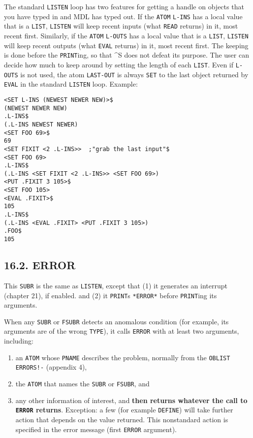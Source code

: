 \documentclass[a4paper,]{article}
\providecommand{\tightlist}{%
  \setlength{\itemsep}{0pt}\setlength{\parskip}{0pt}}
\begin{document}
The standard \texttt{LISTEN} loop has two features for getting a handle on objects that you have typed in and MDL has typed
out. If the \texttt{ATOM} \texttt{L-INS} has a local value that is a \texttt{LIST},
\texttt{LISTEN} will keep recent inputs (what \texttt{READ} returns) in it, most recent first. Similarly, if the
\texttt{ATOM} \texttt{L-OUTS} has a local value that is a \texttt{LIST}, \texttt{LISTEN} will
keep recent outputs (what \texttt{EVAL} returns) in it, most recent first. The keeping is done before the
\texttt{PRINT}ing, so that \^{}S does not defeat its purpose. The user can decide how much to keep
around by setting the length of each \texttt{LIST}. Even if \texttt{L-OUTS} is not used, the atom
\texttt{LAST-OUT} is always \texttt{SET} to the last object returned by \texttt{EVAL} in
the standard \texttt{LISTEN} loop. Example:

\begin{verbatim}
<SET L-INS (NEWEST NEWER NEW)>$
(NEWEST NEWER NEW)
.L-INS$
(.L-INS NEWEST NEWER)
<SET FOO 69>$
69
<SET FIXIT <2 .L-INS>>  ;"grab the last input"$
<SET FOO 69>
.L-INS$
(.L-INS <SET FIXIT <2 .L-INS>> <SET FOO 69>)
<PUT .FIXIT 3 105>$
<SET FOO 105>
<EVAL .FIXIT>$
105
.L-INS$
(.L-INS <EVAL .FIXIT> <PUT .FIXIT 3 105>)
.FOO$
105
\end{verbatim}

\subsection{16.2. ERROR}\label{error}

This \texttt{SUBR} is the same as \texttt{LISTEN}, except that (1) it generates an interrupt (chapter 21), if enabled. and
(2) it \texttt{PRINT}s \texttt{*ERROR*} before \texttt{PRINT}ing its arguments.

When any \texttt{SUBR} or \texttt{FSUBR} detects an anomalous condition (for example, its arguments are of the wrong
\texttt{TYPE}), it calls \texttt{ERROR} with at least two arguments, including:

\begin{enumerate}
\def\labelenumi{\arabic{enumi}.}
\tightlist
\item
  an \texttt{ATOM} whose \texttt{PNAME} describes the problem, normally from the \texttt{OBLIST}
  \texttt{ERRORS!-} (appendix 4),
\item
  the \texttt{ATOM} that names the \texttt{SUBR} or \texttt{FSUBR}, and
\item
  any other information of interest, and \textbf{then returns whatever the call to \texttt{ERROR} returns}. Exception: a
  few (for example \texttt{DEFINE}) will take further action that depends on the value returned.
  This nonstandard action is specified in the error message (first \texttt{ERROR} argument).
\end{enumerate}
\end{document}
